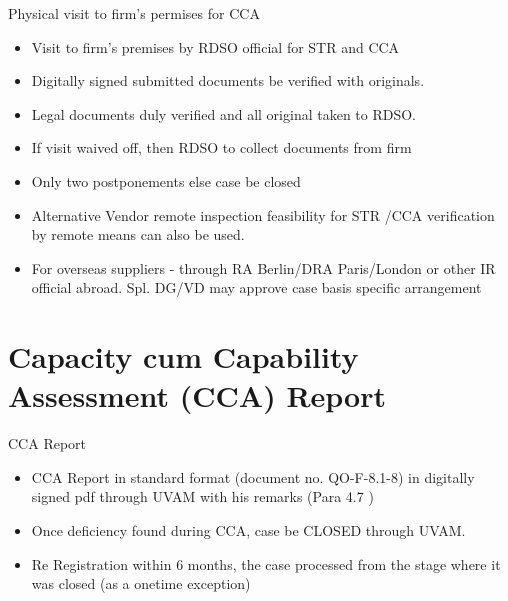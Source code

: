 \documentclass[
  10pt,
  ignorenonframetext,
  aspectratio=43,
]{beamer}
\begin{document}
\begin{frame}{Physical visit to firm's permises for CCA}
\protect\hypertarget{physical-visit-to-firms-permises-for-cca}{}
\begin{itemize}
\item
  Visit to firm's premises by RDSO official for STR and CCA
\item
  Digitally signed submitted documents be verified with originals.
\item
  Legal documents duly verified and all original taken to RDSO.
\item
  If visit waived off, then RDSO to collect documents from firm
\item
  Only two postponements else case be closed
\item
  Alternative Vendor remote inspection feasibility for STR /CCA
  verification by remote means can also be used.
\item
  For overseas suppliers - through RA Berlin/DRA Paris/London or other
  IR official abroad. Spl. DG/VD may approve case basis specific
  arrangement
\end{itemize}
\end{frame}

\hypertarget{capacity-cum-capability-assessment-cca-report}{%
\section{Capacity cum Capability Assessment (CCA)
Report}\label{capacity-cum-capability-assessment-cca-report}}

\begin{frame}{CCA Report}
\protect\hypertarget{cca-report}{}
\begin{itemize}
\item
  CCA Report in standard format (document no. QO-F-8.1-8) in digitally
  signed pdf through UVAM with his remarks (Para 4.7 )
\item
  Once deficiency found during CCA, case be CLOSED through UVAM.
\item
  Re Registration within 6 months, the case processed from the stage
  where it was closed (as a onetime exception)
\end{itemize}
\end{frame}
\end{document}
